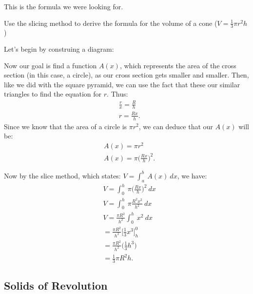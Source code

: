 \documentclass{report}
\begin{document}
    \bigbreak \noindent 
    This is the formula we were looking for.
    \pagebreak \bigbreak \noindent 
    \begin{eg}
        Use the slicing method to derive the formula for the volume of a cone ($V = \frac{1}{3}\pi r^{2}h$)
    \end{eg}
    \bigbreak \noindent 
    Let's begin by construing a diagram:
    \bigbreak \noindent 
    \begin{minipage}[]{0.47\textwidth}
    \end{minipage}
    \begin{minipage}[]{0.47\textwidth}
    Now our goal is find a function $A(x)$, which represents the area of the cross section (in this case, a circle), as our cross section gets smaller and smaller.
    Then, like we did with the square pyramid, we can use the fact that these our similar triangles to find the equation for $r$. Thus:
    \begin{align*}
        &\frac{r}{x} = \frac{R}{h} \\
        &r = \frac{Rx}{h}
    .\end{align*}
    Since we know that the area of a circle is $\pi r^{2}$, we can deduce that our $A(x)$ will be:
    \begin{align*}
        &A(x) = \pi r^{2} \\
        &A(x) = \pi \bigg(\frac{Rx}{h}\bigg)^{2}
    .\end{align*}
    \end{minipage}
    \bigbreak \noindent 
    \bigbreak \noindent 
    Now by the slice method, which states: $V  = \int_{a}^{b}\ A(x)\ dx $, we have:
    \begin{align*}
        &V = \int_{0}^{h}\ \pi \bigg(\frac{Rx}{h}\bigg)^{2}\ dx \\
        &V = \int_{0}^{h}\ \pi \frac{R^{2}x^{2}}{h^{2}}\ dx \\
        &V = \frac{\pi R^{2}}{h^{2}}\int_{0}^{h}\ x^{2}\ dx \\
        &= \frac{\pi R^{2}}{h^{2}}\bigg[\frac{1}{3}x^{3}\bigg]^{0}_{h} \\
        &= \frac{\pi R^{2}}{h^{2}}\bigg(\frac{1}{3}h^{3}\bigg) \\
        &= \frac{1}{3}\pi R^{2}h 
    .\end{align*}

    \pagebreak 
    \subsection*{Solids of Revolution}


    




    







    


    
\end{document}
